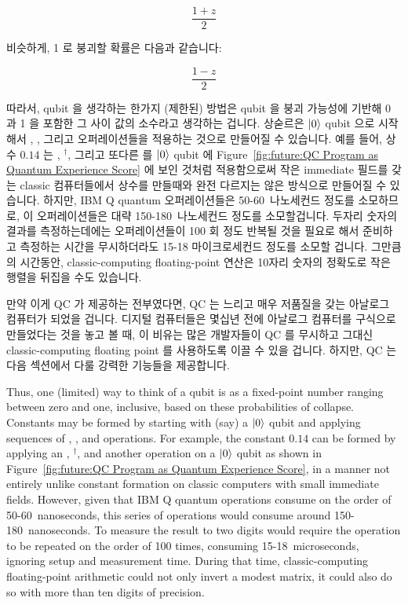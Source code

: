 \begin{equation}
	\frac{1+z}{2}
\end{equation}

비슷하게, 1 로 붕괴할 확률은 다음과 같습니다:

\begin{equation}
	\frac{1-z}{2}
\end{equation}

따라서, qubit 을 생각하는 한가지 (제한된) 방법은 qubit 을 붕괴 가능성에 기반해
0 과 1 을 포함한 그 사이 값의 소수라고 생각하는 겁니다.
상숟르은 $\ket{0}$ qubit 으로 시작해서 , , 그리고 
오퍼레이션들을 적용하는 것으로 만들어질 수 있습니다.
예를 들어, 상수 $0.14$ 는 , $^\dagger$, 그리고 또다른  를
$\ket{0}$ qubit 에
Figure~\ref{fig:future:QC Program as Quantum Experience Score} 에 보인 것처럼
적용함으로써 작은 immediate 필드를 갖는 classic 컴퓨터들에서 상수를 만들때와
완전 다르지는 않은 방식으로 만들어질 수 있습니다.
하지만, IBM Q quantum 오퍼레이션들은 50-60~나노세컨드 정도를 소모하므로, 이
오퍼레이션들은 대략 150-180~나노세컨드 정도를 소모할겁니다.
두자리 숫자의 결과를 측정하는데에는 오퍼레이션들이 100 회 정도 반복될 것을
필요로 해서 준비하고 측정하는 시간을 무시하더라도 15-18 마이크로세컨드 정도를
소모할 겁니다.
그만큼의 시간동안, classic-computing floating-point 연산은 10자리 숫자의
정확도로 작은 행렬을 뒤집을 수도 있습니다.

만약 이게 QC 가 제공하는 전부였다면, QC 는 느리고 매우 저품질을 갖는 아날로그
컴퓨터가 되었을 겁니다.
디지털 컴퓨터들은 몇십년 전에 아날로그 컴퓨터를 구식으로 만들었다는 것을 놓고
볼 때, 이 비유는 많은 개발자들이 QC 를 무시하고 그대신 classic-computing
floating point 를 사용하도록 이끌 수 있을 겁니다.
하지만, QC 는 다음 섹션에서 다룰 강력한 기능들을 제공합니다.
\iffalse

Thus, one (limited) way to think of a qubit is as a fixed-point number
ranging between zero and one, inclusive, based on these probabilities
of collapse.
Constants may be formed by starting with (say) a $\ket{0}$ qubit and
applying sequences of , , and  operations.
For example, the constant $0.14$ can be formed by applying an
, $^\dagger$, and another 
operation on a $\ket{0}$ qubit as shown in
Figure~\ref{fig:future:QC Program as Quantum Experience Score},
in a manner not entirely unlike constant formation on classic
computers with small immediate fields.
However, given that IBM Q quantum operations consume on the
order of 50-60~nanoseconds, this series of operations would
consume around 150-180~nanoseconds.
To measure the result to two digits would require the operation to
be repeated on the order of 100 times, consuming 15-18~microseconds,
ignoring setup and measurement time.
During that time, classic-computing floating-point arithmetic could not
only invert a modest matrix, it could also do so with more than
ten digits of precision.

